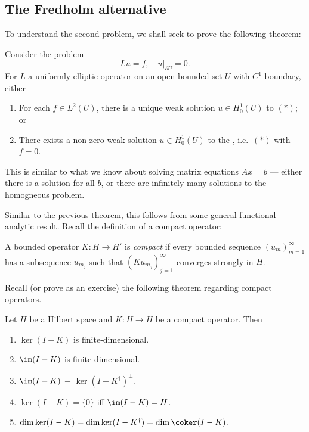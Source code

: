 \documentclass[a4paper]{article}
\begin{document}
\subsection{The Fredholm alternative}
To understand the second problem, we shall seek to prove the following theorem:
\begin{thm}
  Consider the problem
  \[
    Lu = f,\quad u|_{\partial U} = 0.\tag{$*$}
  \]
  For $L$ a uniformly elliptic operator on an open bounded set $U$ with $C^1$ boundary, either
  \begin{enumerate}
    \item For each $f \in L^2(U)$, there is a unique weak solution $u \in H_0^1(U)$ to $(*)$; or
    \item There exists a non-zero weak solution $u \in H_0^1(U)$ to the , i.e.\ $(*)$ with $f = 0$.
  \end{enumerate}
\end{thm}

This is similar to what we know about solving matrix equations $Ax = b$ --- either there is a solution for all $b$, or there are infinitely many solutions to the homogneous problem.

Similar to the previous theorem, this follows from some general functional analytic result. Recall the definition of a compact operator:
\begin{defi}
  A bounded operator $K: H \to H'$ is \emph{compact} if every bounded sequence $(u_m)_{m = 1}^\infty$ has a subsequence $u_{m_j}$ such that $(K u_{m_j})_{j = 1}^\infty$ converges strongly in $H$.
\end{defi}

Recall (or prove as an exercise) the following theorem regarding compact operators.
\begin{thm}
  Let $H$ be a Hilbert space and $K: H \to H$ be a compact operator. Then
  \begin{enumerate}
    \item $\ker (I - K)$ is finite-dimensional.
    \item $\im (I - K)$ is finite-dimensional.
    \item $\im (I - K)$ = $\ker (I - K^\dagger)^\perp$.
    \item $\ker (I - K) = \{0\}$ iff $\im (I - K) = H$.
    \item $\dim \ker (I - K) = \dim \ker (I - K^\dagger) = \dim \coker (I - K)$.
  \end{enumerate}
\end{thm}
\end{document}
